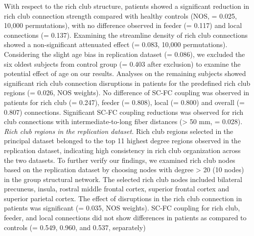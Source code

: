 \begin{refsection}
With respect to the rich club structure, patients showed a significant reduction in rich club connection strength compared with healthy controls (NOS, \pval = 0.025, 10,000 permutations), with no difference observed in feeder (\pval = 0.117) and local connections (\pval = 0.137). Examining the streamline density of rich club connections showed a non-significant attenuated effect (\pval = 0.083, 10,000 permutations). Considering the slight age bias in replication dataset (\pval = 0.086), we excluded the six oldest subjects from control group (\pval = 0.403 after exclusion) to examine the potential effect of age on our results. Analyses on the remaining subjects showed significant rich club connection disruptions in patients for the predefined rich club regions (\pval = 0.026, NOS weights). No difference of SC-FC coupling was observed in patients for rich club (\pval = 0.247), feeder (\pval = 0.808), local (\pval = 0.800) and overall (\pval = 0.807) connections. Significant SC-FC coupling reductions was observed for rich club connections with intermediate-to-long fiber distances (> 50 mm, \pval = 0.028). \\

\noindent
\textit{Rich club regions in the replication dataset.} Rich club regions selected in the principal dataset belonged to the top 11 highest degree regions observed in the replication dataset, indicating high consistency in rich club organization across the two datasets. To further verify our findings, we examined rich club nodes based on the replication dataset by choosing nodes with degree > 20 (10 nodes) in the group structural network. The selected rich club nodes included bilateral precuneus, insula, rostral middle frontal cortex, superior frontal cortex and superior parietal cortex. The effect of disruptions in the rich club connection in patients was significant (\pval = 0.035, NOS weights). SC-FC coupling for rich club, feeder, and local connections did not show differences in patients as compared to controls (\pval = 0.549, 0.960, and 0.537, separately)


\end{refsection}
